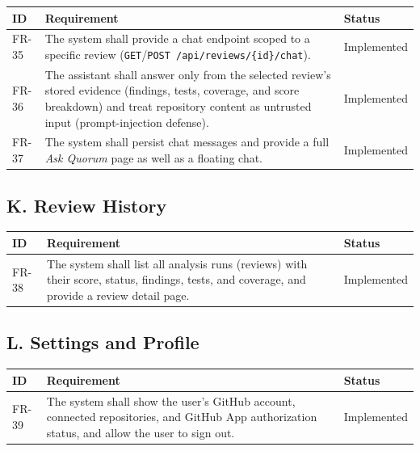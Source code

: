 \begin{longtable}{@{}p{1.4cm}p{11.6cm}p{2.0cm}@{}}
\toprule
\textbf{ID} & \textbf{Requirement} & \textbf{Status} \\
\midrule
\endhead
FR-35 & The system shall provide a chat endpoint scoped to a specific review
(\texttt{GET}/\texttt{POST /api/reviews/\{id\}/chat}). & Implemented \\
FR-36 & The assistant shall answer only from the selected review's stored
evidence (findings, tests, coverage, and score breakdown) and treat repository
content as untrusted input (prompt-injection defense). & Implemented \\
FR-37 & The system shall persist chat messages and provide a full
\emph{Ask Quorum} page as well as a floating chat. & Implemented \\
\bottomrule
\end{longtable}

\subsection{K. Review History}

\begin{longtable}{@{}p{1.4cm}p{11.6cm}p{2.0cm}@{}}
\toprule
\textbf{ID} & \textbf{Requirement} & \textbf{Status} \\
\midrule
\endhead
FR-38 & The system shall list all analysis runs (reviews) with their score,
status, findings, tests, and coverage, and provide a review detail page. & Implemented \\
\bottomrule
\end{longtable}

\subsection{L. Settings and Profile}

\begin{longtable}{@{}p{1.4cm}p{11.6cm}p{2.0cm}@{}}
\toprule
\textbf{ID} & \textbf{Requirement} & \textbf{Status} \\
\midrule
\endhead
FR-39 & The system shall show the user's GitHub account, connected
repositories, and GitHub App authorization status, and allow the user to sign
out. & Implemented \\
\bottomrule
\end{longtable}